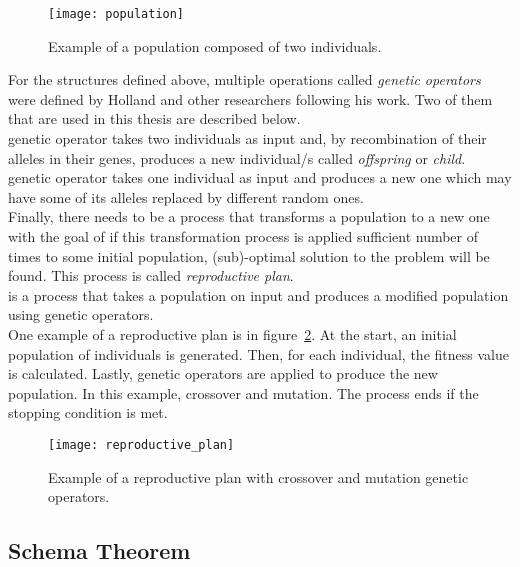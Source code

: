 \begin{figure}
    \texttt{[image: population]}
    \caption[Population example]{Example of a population composed of two individuals.}
    \label{fig:population}
\end{figure}

For the structures defined above, multiple operations called \textit{genetic operators}
were defined by Holland and other researchers following his work.
Two of them that are used in this thesis are described below.\\

 genetic operator takes two individuals as input and, by recombination
of their alleles in their genes, produces a new individual/s called \textit{offspring} or \textit{child}.\\

 genetic operator takes one individual as input and produces a new one
which may have some of its alleles replaced by different random ones.\\

Finally, there needs to be a process that transforms a population
to a new one with the goal of if this transformation process is applied sufficient
number of times to some initial population,
(sub)-optimal solution to the problem will be found.
This process is called \textit{reproductive plan}.\\

 is a process that takes a population on input and produces a modified
population using genetic operators.\\

One example of a reproductive plan is in figure~\ref{fig:reproductive-plan}.
At the start, an initial population of individuals is generated.
Then, for each individual, the fitness value is calculated.
Lastly, genetic operators are applied to produce the new population.
In this example, crossover and mutation.
The process ends if the stopping condition is met.

\begin{figure}[h]
    \texttt{[image: reproductive\_plan]}
    \caption[Example of a reproductive plan]{Example of a reproductive plan with crossover and mutation genetic operators.}
    \label{fig:reproductive-plan}
\end{figure}

\subsection{Schema Theorem}\label{subsec:schema-theorem}

